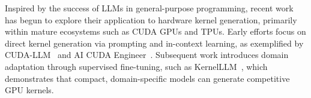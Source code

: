 Inspired by the success of LLMs in general-purpose programming, recent work has begun to explore their application to hardware kernel generation, primarily within mature ecosystems such as CUDA GPUs and TPUs. Early efforts focus on direct kernel generation via prompting and in-context learning, as exemplified by CUDA-LLM~\cite{chen2025cuda} and AI CUDA Engineer~\cite{lange2025ai}. Subsequent work introduces domain adaptation through supervised fine-tuning, such as KernelLLM~\cite{kernelllm2025}, which demonstrates that compact, domain-specific models can generate competitive GPU kernels.

